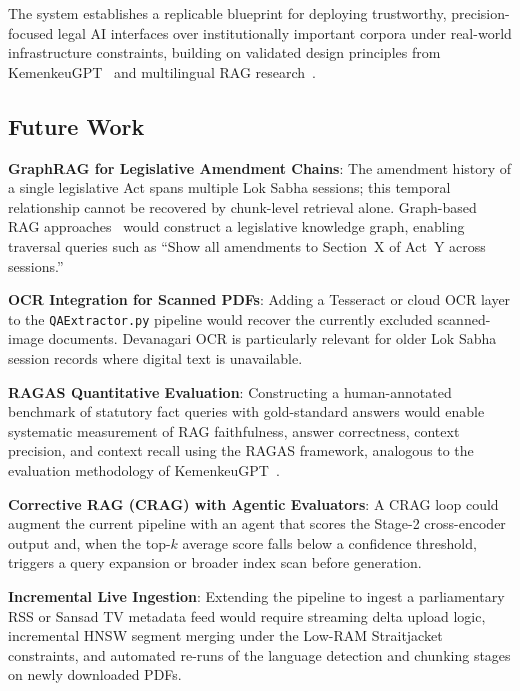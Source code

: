 \documentclass[conference]{IEEEtran}
\begin{document}
The system establishes a replicable blueprint for deploying trustworthy,
precision-focused legal AI interfaces over institutionally important corpora
under real-world infrastructure constraints, building on validated design
principles from KemenkeuGPT~\cite{kemenkeu2024} and multilingual RAG
research~\cite{mrag_settings2024,multilingualrag_2025}.

\subsection{Future Work}

\textbf{GraphRAG for Legislative Amendment Chains}:
The amendment history of a single legislative Act spans multiple Lok Sabha
sessions; this temporal relationship cannot be recovered by chunk-level
retrieval alone.
Graph-based RAG approaches~\cite{graphrag2025,tkgrag2025,kgrag2025} would
construct a legislative knowledge graph, enabling traversal queries such as
``Show all amendments to Section~X of Act~Y across sessions.''

\textbf{OCR Integration for Scanned PDFs}:
Adding a Tesseract or cloud OCR layer to the \texttt{QAExtractor.py} pipeline
would recover the currently excluded scanned-image documents.
Devanagari OCR is particularly relevant for older Lok Sabha session records
where digital text is unavailable.

\textbf{RAGAS Quantitative Evaluation}:
Constructing a human-annotated benchmark of statutory fact queries with
gold-standard answers would enable systematic measurement of RAG faithfulness,
answer correctness, context precision, and context recall using the RAGAS
framework, analogous to the evaluation methodology of KemenkeuGPT~\cite{kemenkeu2024}.

\textbf{Corrective RAG (CRAG) with Agentic Evaluators}:
A CRAG loop could augment the current pipeline with an agent that scores
the Stage-2 cross-encoder output and, when the top-$k$ average score falls
below a confidence threshold, triggers a query expansion or broader index
scan before generation.

\textbf{Incremental Live Ingestion}:
Extending the pipeline to ingest a parliamentary RSS or Sansad TV metadata
feed would require streaming delta upload logic, incremental HNSW segment
merging under the Low-RAM Straitjacket constraints, and automated re-runs
of the language detection and chunking stages on newly downloaded PDFs.

\end{document}
